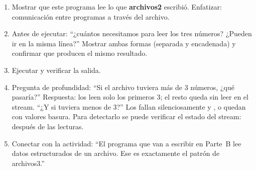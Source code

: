 \documentclass[12pt, oneside]{article}
\begin{document}
\begin{notaprofesor}
  \begin{enumerate}
    \item Mostrar que este programa lee lo que \textbf{archivos2} escribió.
          Enfatizar: comunicación entre programas a través del archivo.
    \item Antes de ejecutar: ``¿cuántos \cpp{>>} necesitamos para leer
          los tres números?  ¿Pueden ir en la misma línea?''
          Mostrar ambas formas (separada y encadenada) y confirmar que
          producen el mismo resultado.
    \item Ejecutar y verificar la salida.
    \item Pregunta de profundidad: ``Si el archivo tuviera más de 3 números,
          ¿qué pasaría?''  Respuesta: los \cpp{>>} leen solo los primeros 3;
          el resto queda sin leer en el stream.  ``¿Y si tuviera menos de
          3?''  Los \cpp{>>} fallan silenciosamente y ,  o
           quedan con valores basura.  Para detectarlo se puede
          verificar el estado del stream:  después
          de las lecturas.
    \item Conectar con la actividad: ``El programa que van a escribir en
          Parte~B lee datos estructurados de un archivo.  Ese es exactamente
          el patrón de archivos3.''
  \end{enumerate}
\end{notaprofesor}
\end{document}
